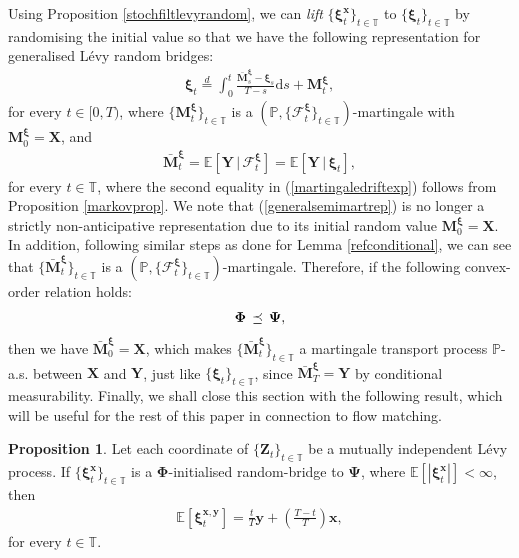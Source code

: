\documentclass{article}
\newcommand{\levy}{{L\'evy }}
\def\P{\mathbb{P}}
\def\E{\mathbb{E}}
\def\T{\mathbb{T}}
\def\dd{\mathrm{d}}
\def\xib{\boldsymbol{\xi}}
\theoremstyle{definition}
\newtheorem{proposition}{Proposition}[section]
\begin{document}
Using Proposition \ref{stochfiltlevyrandom}, we can \emph{lift} $\{\xib^{\boldsymbol{x}}_t\}_{t\in\T}$ to $\{\xib_t\}_{t\in\T}$ by randomising the initial value so that we have the following representation for generalised \levy random bridges:
\begin{align}
\label{generalsemimartrep}
\xib_t \overset{d}{=} \int_0^t \frac{\bar{\mathbf{M}}^{\xib}_s - \xib_s }{T-s}\dd s + \mathbf{M}^{\xib}_t,
\end{align}
for every $t\in[0,T)$, where $\{\mathbf{M}^{\xib}_t\}_{t\in\T}$ is a $(\P,\{\mathcal{F}_{t}^{\xib}\}_{t\in\T})$-martingale with $\mathbf{M}^{\xib}_{0} = \boldsymbol{X}$, and
\begin{align}
\label{martingaledriftexp}
\bar{\mathbf{M}}^{\xib}_t = \E\left[ \boldsymbol{Y} \, | \, \mathcal{F}_{t}^{\xib} \right] = \E\left[ \boldsymbol{Y} \, | \, \xib_t \right],
\end{align}
for every $t\in\T$, where the second equality in (\ref{martingaledriftexp}) follows from Proposition \ref{markovprop}. We note that (\ref{generalsemimartrep}) is no longer a strictly non-anticipative representation due to its initial random value $\mathbf{M}^{\xib}_{0} = \boldsymbol{X}$.
In addition, following similar steps as done for Lemma \ref{refconditional}, we can see that $\{\bar{\mathbf{M}}^{\xib}_t\}_{t\in\T}$ is a $(\P,\{\mathcal{F}_{t}^{\xib}\}_{t\in\T})$-martingale. Therefore, if the following convex-order relation holds:
\begin{align}
\boldsymbol{\Phi} \, \preceq \,  \boldsymbol{\Psi}, \notag
\end{align}
then we have $\bar{\mathbf{M}}^{\xib}_0 = \boldsymbol{X}$, which makes $\{\bar{\mathbf{M}}^{\xib}_t\}_{t\in\T}$ a martingale transport process $\P$-a.s. between $\boldsymbol{X}$ and $\boldsymbol{Y}$, just like $\{\xib_t\}_{t\in\T}$, since $\bar{\mathbf{M}}^{\xib}_T = \boldsymbol{Y}$ by conditional measurability.
Finally, we shall close this section with the following result, which will be useful for the rest of this paper in connection to flow matching.
\begin{proposition}
\label{expectationcorelink}
Let each coordinate of $\{\mathbf{Z}_t\}_{t\in\T}$ be a mutually independent \levy process. If $\{\xib^{\boldsymbol{x}}_t\}_{t\in\T}$ is a $\boldsymbol{\Phi}$-initialised random-bridge to $\boldsymbol{\Psi}$, where $\E[|\xib^{\boldsymbol{x}}_t|] < \infty$, then
\begin{align}
\label{coreexpectationbridge}
\E\left[\xib^{\boldsymbol{x},\boldsymbol{y}}_t\right] = \frac{t}{T}\boldsymbol{y} + \left(\frac{T-t}{T}\right)\boldsymbol{x},
\end{align}
for every $t\in\T$.
\end{proposition}
\end{document}
